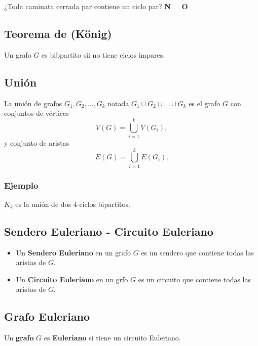 \documentclass[a4paper,dvipsnames]{book}
\begin{document}
¿Toda caminata cerrada par contiene un ciclo par?  {\color{Violet} \textbf{N \ \ O}}

\subsection{Teorema de (König)}
\label{ssec:teorema_de_konig_}

Un grafo \(G\) es bibpartito sii no tiene ciclos impares.

\subsection{Unión}
\label{ssec:union}

La unión de grafos \(G_1,G_2,\ldots,G_{k}\) notada \(G_1\cup G_2\cup \ldots\cup
G_{k}\) es el grafo  \(G\) con conjuntos de vértices
\[ V\left(G\right) =\bigcup_{i=1}^{k}V\left(G_{i}\right) ,\]
y conjunto de aristas
\[E\left(G\right)=\bigcup_{i=1}^{k}E\left(G_{i}\right).\]

\subsubsection{Ejemplo}
\(K_4\) es la unión de dos 4-ciclos bipartitos.

\subsection{Sendero Euleriano - Circuito Euleriano}
\label{ssec:sendero_euleriano_circuito_euleriano}
\begin{itemize}
    \item Un \textbf{Sendero Euleriano} en un grafo \(G\) es un sendero que
        contiene todas las aristas de  \(G\).
    \item  Un \textbf{Circuito Euleriano} en un grfo \(G\) es un circuito que
        contiene todas las aristas de \(G\).
\end{itemize}

\subsection{Grafo Euleriano}
\label{ssec:grafo_euleriano}
Un \textbf{grafo} \(G\) es \textbf{Euleriano} si tiene un circuito Euleriano.
\end{document}
